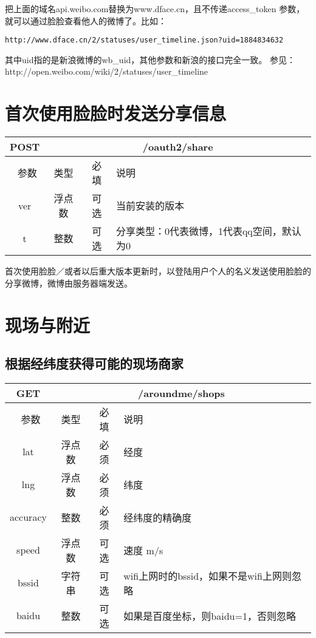 \documentclass[cs4size]{ctexartutf8}
\begin{document}
把上面的域名api.weibo.com替换为www.dface.cn，且不传递access\_token 参数，就可以通过脸脸查看他人的微博了。比如：
\begin{verbatim}
http://www.dface.cn/2/statuses/user_timeline.json?uid=1884834632
\end{verbatim}
其中uid指的是新浪微博的wb\_uid，其他参数和新浪的接口完全一致。
参见：http://open.weibo.com/wiki/2/statuses/user\_timeline



\section{首次使用脸脸时发送分享信息}

\begin{table}[H]
   \begin{center}
\begin{tabular}{|c|c|c|p{12cm}|}
\hline
POST & \multicolumn{3}{|c|}{/oauth2/share} \\
\hline\hline
 \  参数  & 类型 & 必填 &  说明  \\
\hline
   ver  & 浮点数 & 可选 &  当前安装的版本\\
\hline
   t  & 整数 & 可选 &  分享类型：0代表微博，1代表qq空间，默认为0\\
\hline
\end{tabular}
   \end{center}
\end{table}

首次使用脸脸／或者以后重大版本更新时，以登陆用户个人的名义发送使用脸脸的分享微博，微博由服务器端发送。


\section{现场与附近}

\subsection{根据经纬度获得可能的现场商家}

\begin{table}[H]
   \begin{center}
\begin{tabular}{|c|c|c|p{12cm}|}
\hline
GET & \multicolumn{3}{|c|}{/aroundme/shops} \\
\hline\hline
 \  参数  & 类型 & 必填 &  说明  \\
\hline
 lat  & 浮点数 & 必须 & 经度\\
\hline
 lng  &  浮点数 & 必须 & 纬度\\ 
\hline
 accuracy  & 整数 & 必须 & 经纬度的精确度\\ 
\hline
 speed  & 浮点数 & 可选 & 速度 m/s\\   
\hline
 bssid  & 字符串 & 可选 & wifi上网时的bssid，如果不是wifi上网则忽略\\  
\hline
 baidu  & 整数 & 可选 & 如果是百度坐标，则baidu=1，否则忽略\\  
\hline
\end{tabular}
   \end{center}
\end{table}
\end{document}
